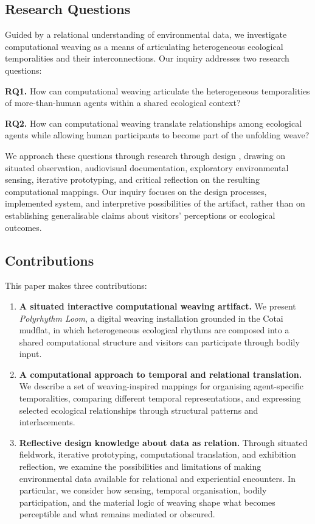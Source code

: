 \documentclass[manuscript,review,anonymous]{acmart}
\begin{document}
\subsection{Research Questions}

Guided by a relational understanding of environmental data, we investigate computational weaving as a means of articulating heterogeneous ecological temporalities and their interconnections. Our inquiry addresses two research questions:

\textbf{RQ1.} How can computational weaving articulate the heterogeneous temporalities of more-than-human agents within a shared ecological context?

\textbf{RQ2.} How can computational weaving translate relationships among ecological agents while allowing human participants to become part of the unfolding weave?

We approach these questions through research through design \cite{zimmerman2007,gaver2012}, drawing on situated observation, audiovisual documentation, exploratory environmental sensing, iterative prototyping, and critical reflection on the resulting computational mappings. Our inquiry focuses on the design processes, implemented system, and interpretive possibilities of the artifact, rather than on establishing generalisable claims about visitors' perceptions or ecological outcomes.

\subsection{Contributions}

This paper makes three contributions:

\begin{enumerate}

\item \textbf{A situated interactive computational weaving artifact.} We present \emph{Polyrhythm Loom}, a digital weaving installation grounded in the Cotai mudflat, in which heterogeneous ecological rhythms are composed into a shared computational structure and visitors can participate through bodily input.

\item \textbf{A computational approach to temporal and relational translation.} We describe a set of weaving-inspired mappings for organising agent-specific temporalities, comparing different temporal representations, and expressing selected ecological relationships through structural patterns and interlacements.

\item \textbf{Reflective design knowledge about data as relation.} Through situated fieldwork, iterative prototyping, computational translation, and exhibition reflection, we examine the possibilities and limitations of making environmental data available for relational and experiential encounters. In particular, we consider how sensing, temporal organisation, bodily participation, and the material logic of weaving shape what becomes perceptible and what remains mediated or obscured.

\end{enumerate}
\end{document}
